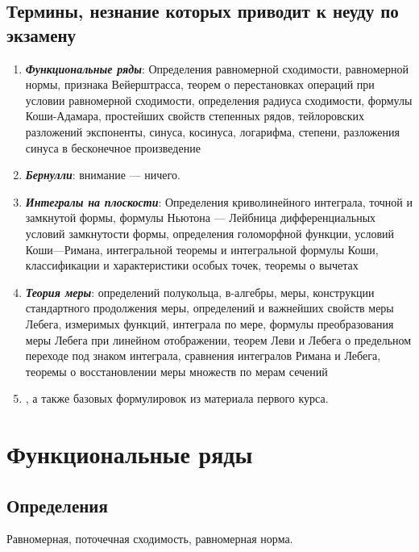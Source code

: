 \documentclass[12pt, a4paper, oneside]{memoir}
\begin{document}
\section{Термины, незнание которых приводит к неуду по экзамену}

\begin{enumerate}
    \item \textit{\textbf{Функциональные ряды}}: Определения равномерной сходимости, равномерной нормы, признака Вейерштрасса, теорем о перестановках операций при условии равномерной сходимости, определения радиуса сходимости, формулы Коши-Адамара, простейших свойств степенных рядов, тейлоровских разложений экспоненты, синуса, косинуса, логарифма, степени, разложения синуса в бесконечное произведение
    
    \item \textit{\textbf{Бернулли}}: внимание — ничего.

    \item \textit{\textbf{Интегралы на плоскости}}: Определения криволинейного интеграла, точной и замкнутой формы, формулы Ньютона — Лейбница дифференциальных условий замкнутости формы, определения голоморфной функции, условий Коши—Римана, интегральной теоремы и интегральной формулы Коши, классификации и характеристики особых точек, теоремы о вычетах
    
    \item \textit{\textbf{Теория меры}}: определений полукольца, в-алгебры, меры, конструкции стандартного
    продолжения меры, определений и важнейших свойств меры Лебега, измеримых функций, интеграла
    по мере, формулы преобразования меры Лебега при линейном отображении, теорем Леви и Лебега
    о предельном переходе под знаком интеграла, сравнения интегралов Римана и Лебега, теоремы о
    восстановлении меры множеств по мерам сечений
    
    \item , а также базовых формулировок из материала первого курса.
\end{enumerate}

\chapter{Функциональные ряды}

\section{Определения}

Равномерная, поточечная сходимость, равномерная норма.
\end{document}
